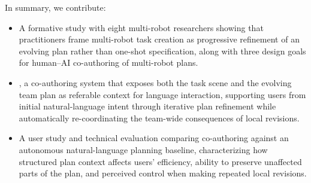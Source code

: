 In summary, we contribute:
\begin{itemize}
    \item A formative study with eight multi-robot researchers showing that practitioners frame multi-robot task creation as progressive refinement of an evolving plan rather than one-shot specification, along with three design goals for human--AI co-authoring of multi-robot plans.
    \item \oursystem{}, a co-authoring system that exposes both the task scene and the evolving team plan as referable context for language interaction, supporting users from initial natural-language intent through iterative plan refinement while automatically re-coordinating the team-wide consequences of local revisions.
    \item A user study and technical evaluation comparing co-authoring against an autonomous natural-language planning baseline, characterizing how structured plan context affects users' efficiency, ability to preserve unaffected parts of the plan, and perceived control when making repeated local revisions.
\end{itemize}